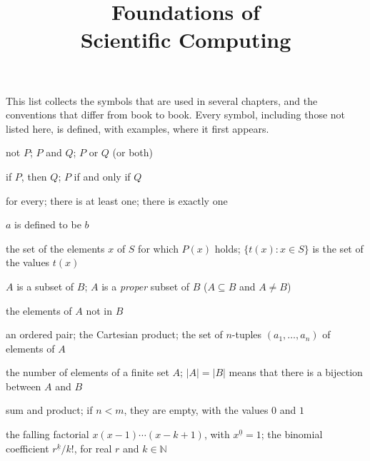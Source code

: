 \documentclass{sdbook-eng}
\title{Foundations of\\Scientific Computing}
\author{}
\date{}
\begin{document}
\frontmatter
\maketitle
\tableofcontents

\notationchapter
This list collects the symbols that are used in several chapters, and the conventions that differ from book to book. Every symbol, including those not listed here, is defined, with examples, where it first appears.

\begin{symbols}
\item[$\neg P$, $P\wedge Q$, $P\vee Q$] not $P$; $P$ and $Q$; $P$ or $Q$ (or both)
\item[$P\Rightarrow Q$, $P\Leftrightarrow Q$] if $P$, then $Q$; $P$ if and only if $Q$
\item[$\forall$, $\exists$, $\exists!$] for every; there is at least one; there is exactly one
\item[$a\coloneqq b$] $a$ is defined to be $b$
\item[$\{x\in S: P(x)\}$] the set of the elements $x$ of $S$ for which $P(x)$ holds; $\{t(x): x\in S\}$ is the set of the values $t(x)$
\item[$A\subseteq B$, $A\subset B$] $A$ is a subset of $B$; $A$ is a \emph{proper} subset of $B$ ($A\subseteq B$ and $A\ne B$)
\item[$A\setminus B$] the elements of $A$ not in $B$
\item[$(a,b)$, $A\times B$, $A^n$] an ordered pair; the Cartesian product; the set of $n$-tuples $(a_1,\ldots,a_n)$ of elements of $A$
\item[$|A|$] the number of elements of a finite set $A$; $|A|=|B|$ means that there is a bijection between $A$ and $B$
\item[$\sum_{k=m}^{n}a_k$, $\prod_{k=m}^{n}a_k$] sum and product; if $n<m$, they are empty, with the values $0$ and $1$
\item[$x^{\underline k}$, $\binom rk$] the falling factorial $x(x-1)\cdots(x-k+1)$, with $x^{\underline 0}=1$; the binomial coefficient $r^{\underline k}/k!$, for real $r$ and $k\in\mathbb N$
\end{symbols}
\end{document}
